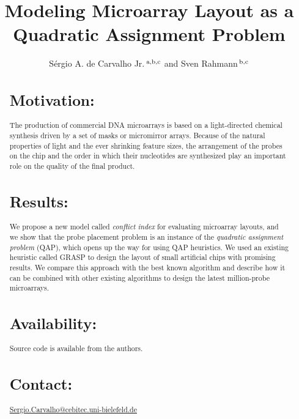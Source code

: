 \documentclass{bioinfo}
\begin{document}

\title[Modeling Microarray Layout as a Quadratic Assignment
Problem]{Modeling Microarray Layout as a Quadratic Assignment Problem}

\author[de Carvalho Jr. and Rahmann]{S\'ergio A. de Carvalho Jr.\,$^{\rm a,b,c}$ and Sven Rahmann\,$^{\rm b,c}$}
\address{$^{\rm a}$Graduiertenkolleg Bioinformatik, Bielefeld University, Germany,\\
  $^{\rm b}$International NRW Graduate School in Bioinformatics and Genome Research, Bielefeld University, Germany,\\
  $^{\rm c}$Algorithms and Statistics for Systems Biology group, Genome Informatics, Technische Fakult\"at, Bielefeld University, D-33594 Bielefeld, Germany.
}
\maketitle

\begin{abstract}
\section{Motivation:}
The production of commercial DNA microarrays is based on a
light-directed chemical synthesis driven by a set of masks or
micromirror arrays. Because of the natural properties of light and the
ever shrinking feature sizes, the arrangement of the probes on the
chip and the order in which their nucleotides are synthesized play an
important role on the quality of the final product.
\section{Results:}
We propose a new model called \emph{conflict index} for evaluating
microarray layouts, and we show that the probe placement problem is an
instance of the \emph{quadratic assignment problem} (QAP), which opens
up the way for using QAP heuristics. We used an existing heuristic
called GRASP to design the layout of small artificial chips with
promising results. We compare this approach with the best known
algorithm and describe how it can be combined with other existing
algorithms to design the latest million-probe microarrays.
\section{Availability:}
Source code is available from the authors.
\section{Contact:} \href{Sergio.Carvalho@cebitec.uni-bielefeld.de}{Sergio.Carvalho@cebitec.uni-bielefeld.de}
\end{abstract}
\end{document}

